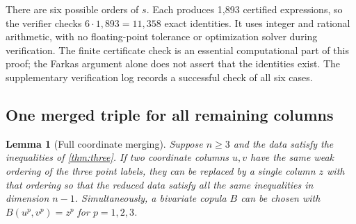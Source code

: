 \documentclass[a4paper,11pt]{amsart}
\numberwithin{equation}{section}
\newtheorem{lemma}[lemma]{Lemma}
\theoremstyle{definition}
\theoremstyle{remark}
\begin{document}
There are six possible orders of $s$. Each produces 1,893 certified
expressions, so the verifier checks $6\cdot1,893=11,358$ exact identities.
It uses integer and rational arithmetic, with no floating-point tolerance
or optimization solver during verification. The finite certificate check is
an essential computational part of this proof; the Farkas argument alone
does not assert that the identities exist. The supplementary verification log records a successful check of all
six cases.

\subsection{One merged triple for all remaining columns}
\label{subsec:merge-common}
\begin{lemma}[Full coordinate merging]\label{lem:merge-full}
Suppose $n\geq3$ and the data satisfy the inequalities of
\cref{thm:three}. If two coordinate columns $u,v$ have the same weak
ordering of the three point labels, they can be replaced by a single
column $z$ with that ordering so that the reduced data satisfy all the
same inequalities in dimension $n-1$. Simultaneously, a bivariate copula
$B$ can be chosen with $B(u^p,v^p)=z^p$ for $p=1,2,3$.
\end{lemma}
\end{document}
